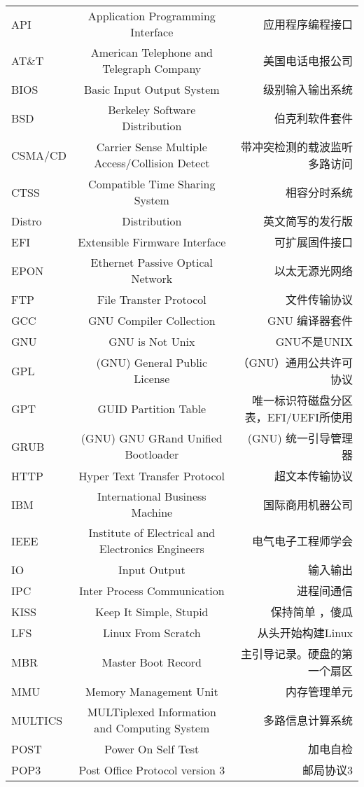 \begin{landscape}
\begin{center}
\begin{supertabular}{l|c|r}
API & Application Programming Interface & 应用程序编程接口 \\
AT\&T & American Telephone and Telegraph Company & 美国电话电报公司\\
BIOS & Basic Input Output System & 级别输入输出系统\\
BSD & Berkeley Software Distribution & 伯克利软件套件 \\
CSMA/CD & Carrier Sense Multiple Access/Collision Detect & 带冲突检测的载波监听多路访问  \\
CTSS & Compatible Time Sharing System & 相容分时系统 \\
Distro & Distribution & 英文简写的发行版 \\
EFI & Extensible Firmware Interface & 可扩展固件接口 \\
EPON & Ethernet Passive Optical Network & 以太无源光网络\\
FTP & File Transter Protocol & 文件传输协议 \\
GCC & GNU Compiler Collection & GNU 编译器套件 \\
GNU & GNU is Not Unix & GNU不是UNIX \\
GPL & (GNU) General Public License & （GNU）通用公共许可协议 \\
GPT & GUID Partition Table & 唯一标识符磁盘分区表，EFI/UEFI所使用\\
GRUB & (GNU) GNU GRand Unified Bootloader & (GNU) 统一引导管理器 \\
HTTP & Hyper Text Transfer Protocol & 超文本传输协议 \\
IBM & International Business Machine & 国际商用机器公司 \\
IEEE & Institute of Electrical and Electronics Engineers  & 电气电子工程师学会\\
IO & Input Output & 输入输出 \\
IPC & Inter Process Communication & 进程间通信 \\
KISS & Keep It Simple, Stupid& 保持简单 ，傻瓜 \\

LFS & Linux From Scratch & 从头开始构建Linux \\
MBR & Master Boot Record & 主引导记录。硬盘的第一个扇区 \\
MMU & Memory Management Unit & 内存管理单元 \\

MULTICS & MULTiplexed Information and Computing System & 多路信息计算系统 \\
POST & Power On Self Test & 加电自检\\
POP3 & Post Office Protocol version 3 & 邮局协议3\\


\end{supertabular}
\end{center}
\end{landscape}
